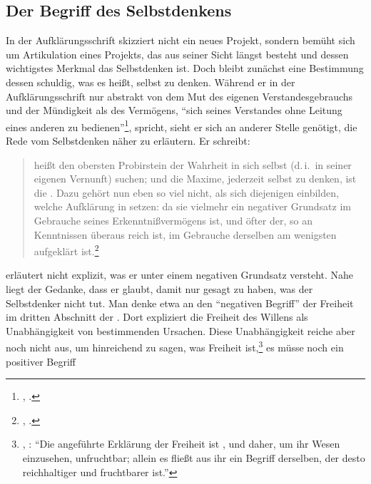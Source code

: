 \subsection{Der Begriff des
Selbstdenkens}\label{subsection:DerBegriffdesSelbstdenkens}
In der Aufklärungsschrift skizziert  nicht ein neues
Projekt, sondern bemüht sich um Artikulation eines Projekts, das aus seiner
Sicht längst besteht und dessen wichtigstes Merkmal das Selbstdenken ist. Doch
bleibt  zunächst eine Bestimmung dessen schuldig, was es
heißt, selbst zu denken. Während er in der Aufklärungsschrift nur abstrakt von
dem Mut des eigenen Verstandesgebrauchs und der Mündigkeit als des Vermögens,
\enquote{sich seines Verstandes ohne Leitung eines anderen zu
bedienen}\footnote{\cite[][A~481]{Kant:BeantwortungderFrage:WasistAufklaerung?1977},
\cite[][VIII: 35.3]{Kant:GesammelteWerke1900ff.}.}, spricht, sieht er sich an
anderer Stelle genötigt, die Rede vom Selbstdenken näher zu erläutern. Er
schreibt:
\begin{quote}\label{def:selbstdenken}
  heißt den obersten Probirstein der Wahrheit in sich selbst
(d.\,i.\ in seiner eigenen Vernunft) suchen; und die Maxime, jederzeit selbst zu
denken, ist die . Dazu gehört nun eben so viel nicht, als sich
diejenigen einbilden, welche Aufklärung in  setzen: da sie
vielmehr ein negativer Grundsatz im Gebrauche seines Erkenntnißvermögens ist, und öfter
der, so an Kenntnissen überaus reich ist, im Gebrauche derselben am wenigsten
aufgeklärt
ist.\footnote{\cite[][A 329]{Kant:Washeisst:SichimDenkenorientieren?1977},
\cite[][VIII: 146.29--35]{Kant:GesammelteWerke1900ff.}.}
\end{quote}
 erläutert nicht explizit, was er unter einem negativen
Grundsatz versteht. Nahe liegt der Gedanke, dass er glaubt, damit nur gesagt zu
haben, was der Selbstdenker nicht tut. Man denke etwa an den \enquote{negativen
Begriff} der Freiheit im dritten Abschnitt der . Dort
expliziert  die Freiheit des Willens als Unabhängigkeit von
bestimmenden Ursachen. Diese Unabhängigkeit reiche aber noch nicht aus, um
hinreichend zu sagen, was Freiheit ist,\footnote{\cite[Vgl.][BA~97]{Kant:GrundlegungzurMetaphysikderSitten1965},
\cite[IV: 446.13--15]{Kant:GesammelteWerke1900ff.}: \enquote{Die angeführte
Erklärung der Freiheit ist , und daher, um ihr Wesen einzusehen,
unfruchtbar; allein es fließt aus ihr ein  Begriff derselben, der
desto reichhaltiger und fruchtbarer ist.}} es müsse noch ein positiver Begriff
